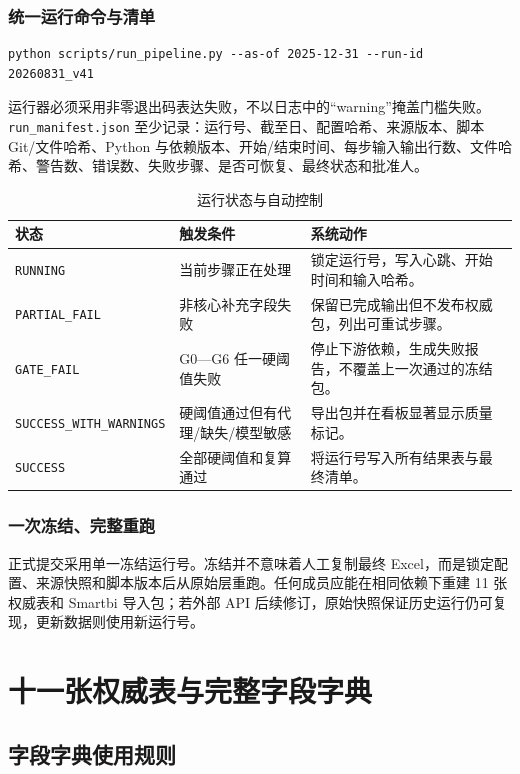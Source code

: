 \documentclass[UTF8,fontset=windows,12pt,openany]{ctexbook}
\newcommand{\Field}[1]{{\small\nolinkurl{#1}}}
\newcommand{\File}[1]{{\small\begingroup\urlstyle{same}\nolinkurl{#1}\endgroup}}
\begin{document}
\section{统一运行命令与清单}

\begin{verbatim}
python scripts/run_pipeline.py --as-of 2025-12-31 --run-id 20260831_v41
\end{verbatim}

运行器必须采用非零退出码表达失败，不以日志中的“warning”掩盖门槛失败。\File{run_manifest.json} 至少记录：运行号、截至日、配置哈希、来源版本、脚本 Git/文件哈希、Python 与依赖版本、开始/结束时间、每步输入输出行数、文件哈希、警告数、错误数、失败步骤、是否可恢复、最终状态和批准人。

\begin{longtable}{p{3.5cm}p{4.2cm}p{5.7cm}}
\caption{运行状态与自动控制}\label{tab:run-status}\\
\toprule
\textbf{状态} & \textbf{触发条件} & \textbf{系统动作}\\
\midrule
\Field{RUNNING} & 当前步骤正在处理 & 锁定运行号，写入心跳、开始时间和输入哈希。\\
\Field{PARTIAL_FAIL} & 非核心补充字段失败 & 保留已完成输出但不发布权威包，列出可重试步骤。\\
\Field{GATE_FAIL} & G0—G6 任一硬阈值失败 & 停止下游依赖，生成失败报告，不覆盖上一次通过的冻结包。\\
\Field{SUCCESS_WITH_WARNINGS} & 硬阈值通过但有代理/缺失/模型敏感 & 导出包并在看板显著显示质量标记。\\
\Field{SUCCESS} & 全部硬阈值和复算通过 & 将运行号写入所有结果表与最终清单。\\
\bottomrule
\end{longtable}

\section{一次冻结、完整重跑}

正式提交采用单一冻结运行号。冻结并不意味着人工复制最终 Excel，而是锁定配置、来源快照和脚本版本后从原始层重跑。任何成员应能在相同依赖下重建 11 张权威表和 Smartbi 导入包；若外部 API 后续修订，原始快照保证历史运行仍可复现，更新数据则使用新运行号。

\part{十一张权威表与完整字段字典}

\chapter{字段字典使用规则}
\end{document}
